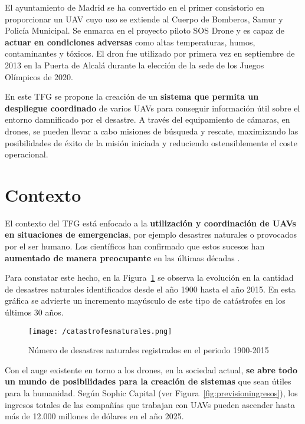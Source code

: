 El ayuntamiento de Madrid se ha convertido en el primer consistorio en proporcionar un \acs{UAV} cuyo uso se extiende al Cuerpo de Bomberos, Samur y Policía Municipal. Se enmarca en el proyecto piloto SOS Drone \cite{sosdrone} y es capaz de \textbf{actuar en condiciones adversas} como altas temperaturas, humos, contaminantes y tóxicos. El dron fue utilizado por primera vez en septiembre de 2013 en la Puerta de Alcalá durante la elección de la sede de los Juegos Olímpicos de 2020.

En este \acs{TFG} se propone la creación de un \textbf{sistema que permita un despliegue coordinado} de varios \acs{UAV}s para conseguir información útil sobre el entorno damnificado por el desastre. A través del equipamiento de cámaras, en drones, se pueden llevar a cabo misiones de búsqueda y rescate, maximizando las posibilidades de éxito de la misión iniciada y reduciendo ostensiblemente el coste operacional.

\section{Contexto}
\label{sec:contexto}

El contexto del \acs{TFG} está enfocado a la \textbf{utilización y coordinación de \acs{UAV}s en situaciones de emergencias}, por ejemplo desastres naturales o provocados por el ser humano. Los científicos han confirmado que estos sucesos han \textbf{aumentado de manera preocupante} en las últimas décadas \cite{aumento}.

Para constatar este hecho, en la Figura~\ref{fig:catastrofesnat} se observa la evolución en la cantidad de desastres naturales identificados desde el año 1900 hasta el año 2015. En esta gráfica se advierte un incremento mayúsculo de este tipo de catástrofes en los últimos 30 años.

\begin{figure}[!h]
\begin{center}
\texttt{[image: /catastrofesnaturales.png]}
\caption[Número de desastres naturales registrados en el periodo 1900-2015]{Número de desastres naturales registrados en el periodo 1900-2015 \footnotemark}
\label{fig:catastrofesnat}
\end{center}
\end{figure}


\clearpage

Con el auge existente en torno a los drones, en la sociedad actual, \textbf{se abre todo un mundo de posibilidades para la creación de sistemas} que sean útiles para la humanidad. Según Sophic Capital (ver Figura~\ref{fig:previsioningresos}), los ingresos totales de las compañías que trabajan con \acs{UAV}s pueden ascender hasta más de 12.000 millones de dólares en el año 2025.
 
